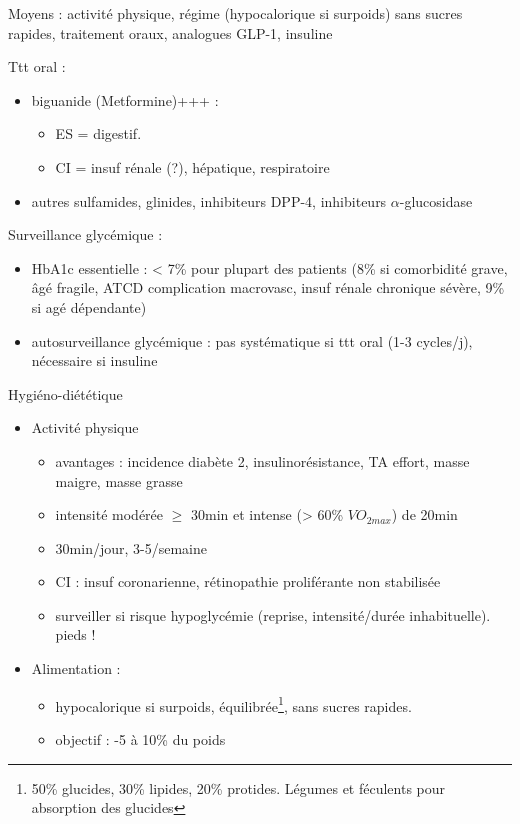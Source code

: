 \documentclass[11pt]{article}
\begin{document}
Moyens  : activité physique, régime (hypocalorique si surpoids) sans sucres
rapides, traitement oraux, analogues GLP-1, insuline

Ttt oral :
\begin{itemize}
\item biguanide (Metformine)+++ : 
\begin{itemize}
\item ES = digestif.
\item CI = insuf rénale (?), hépatique, respiratoire
\end{itemize}
\item autres sulfamides, glinides, inhibiteurs DPP-4, inhibiteurs \(\alpha\)-glucosidase
\end{itemize}

Surveillance glycémique :
\begin{itemize}
\item HbA1c essentielle : < 7\% pour plupart des patients (8\% si comorbidité grave,
âgé fragile, ATCD complication macrovasc, insuf rénale chronique sévère, 9\% si
agé dépendante)
\item autosurveillance glycémique : pas systématique si ttt oral (1-3 cycles/j),
nécessaire si insuline
\end{itemize}

Hygiéno-diététique
\begin{itemize}
\item Activité physique 
\begin{itemize}
\item avantages : \dec incidence diabète 2, \inc insulinorésistance, \inc TA
effort, \inc masse maigre, \dec masse grasse
\item intensité modérée  \(\ge\) 30min et intense (> 60\% \(VO_{2max}\)) de 20min
\item 30min/jour, 3-5/semaine
\item CI : insuf coronarienne, rétinopathie proliférante non stabilisée
\item surveiller si risque hypoglycémie (reprise, intensité/durée
inhabituelle). \danger{} pieds !
\end{itemize}
\item Alimentation : 
\begin{itemize}
\item hypocalorique si surpoids, équilibrée\footnote{50\% glucides, 30\% lipides, 20\% protides. Légumes et féculents pour \inc
absorption des glucides}, sans sucres rapides.
\item objectif : -5 à 10\% du poids
\end{itemize}
\end{itemize}
\end{document}
